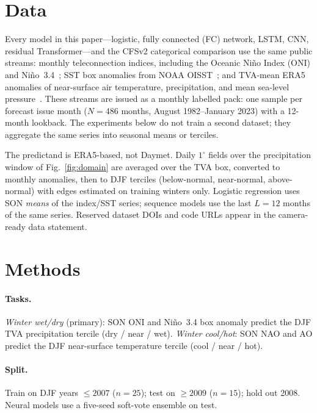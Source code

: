 \documentclass{article}
\begin{document}
\section{Data}

Every model in this paper---logistic, fully connected (FC) network, LSTM, CNN, residual Transformer---and the CFSv2 categorical comparison use the same public streams: monthly teleconnection indices, including the Oceanic Ni\~{n}o Index (ONI) and Ni\~{n}o~3.4~\citep{cpc-oni,barnston1997nino34}; SST box anomalies from NOAA OISST~\citep{huang2021oisst}; and TVA-mean ERA5 anomalies of near-surface air temperature, precipitation, and mean sea-level pressure~\citep{hersbach2020era5}. These streams are issued as a monthly labelled pack: one sample per forecast issue month (\(N{=}486\) months, August 1982--January 2023) with a 12-month lookback. The experiments below do not train a second dataset; they aggregate the same series into seasonal means or terciles.

The predictand is ERA5-based, not Daymet. Daily \(1^{\circ}\) fields over the precipitation window of Fig.~\ref{fig:domain} are averaged over the TVA box, converted to monthly anomalies, then to DJF terciles (below-normal, near-normal, above-normal) with edges estimated on training winters only. Logistic regression uses SON \emph{means} of the index/SST series; sequence models use the last \(L{=}12\) months of the same series. Reserved dataset DOIs and code URLs appear in the camera-ready data statement.

\section{Methods}

\paragraph{Tasks.}
\emph{Winter wet/dry} (primary): SON ONI and Ni\~{n}o~3.4 box anomaly predict the DJF TVA precipitation tercile (dry / near / wet). \emph{Winter cool/hot}: SON NAO and AO predict the DJF near-surface temperature tercile (cool / near / hot).

\paragraph{Split.}
Train on DJF years \(\le 2007\) (\(n{=}25\)); test on \(\ge 2009\) (\(n{=}15\)); hold out 2008. Neural models use a five-seed soft-vote ensemble on test.
\end{document}
